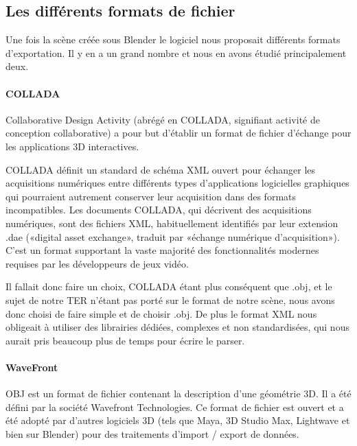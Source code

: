 \documentclass[a4paper,12pt]{report}
\begin{document}
\subsection{Les différents formats de fichier}

Une fois la scène créée sous Blender le logiciel nous proposait différents formats d'exportation. Il y en a un grand nombre et nous en avons étudié principalement deux.

\paragraph{COLLADA}

Collaborative Design Activity (abrégé en COLLADA, signifiant activité de conception collaborative) a pour but d'établir un format de fichier d'échange pour les applications 3D interactives.

COLLADA définit un standard de schéma XML ouvert pour échanger les acquisitions numériques entre différents types d'applications logicielles graphiques qui pourraient autrement conserver leur acquisition dans des formats incompatibles. Les documents COLLADA, qui décrivent des acquisitions numériques, sont des fichiers XML, habituellement identifiés par leur extension .dae («digital asset exchange», traduit par «échange numérique d'acquisition»).
C'est un format supportant la vaste majorité des fonctionnalités modernes
requises par les développeurs de jeux vidéo. 

Il fallait donc faire un choix, COLLADA étant plus conséquent que .obj, et le sujet de notre TER n'étant pas porté sur le format de notre scène, 
nous avons donc choisi de faire simple et de choisir .obj. De plus le format XML nous obligeait à utiliser des librairies dédiées, complexes et non standardisées, qui nous aurait pris beaucoup plus de temps pour écrire le parser.

\paragraph{WaveFront}

OBJ est un format de fichier contenant la description d'une géométrie 3D. Il a été défini par la société Wavefront Technologies. Ce format de fichier est ouvert et a été adopté par d'autres logiciels 3D (tels que Maya, 3D Studio Max, Lightwave et bien sur Blender) pour des traitements d'import / export de données.
\end{document}
